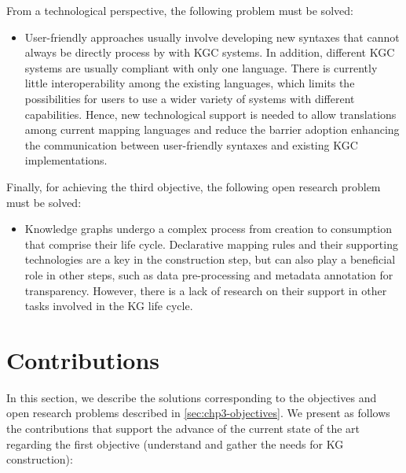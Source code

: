 From a technological perspective, the following problem must be solved:
\begin{itemize}

    \item User-friendly approaches usually involve developing new syntaxes that cannot always be directly process by with KGC systems. In addition, different KGC systems are usually compliant with only one language. There is currently little interoperability among the existing languages, which limits the possibilities for users to use a wider variety of systems with different capabilities. Hence, new technological support is needed to allow translations among current mapping languages and reduce the barrier adoption enhancing the communication between user-friendly syntaxes and existing KGC implementations.   

\end{itemize}

Finally, for achieving the third objective, the following open research problem must be solved:

\begin{itemize}
    \item Knowledge graphs undergo a complex process from creation to consumption that comprise their life cycle. Declarative mapping rules and their supporting technologies are a key in the construction step, but can also play a beneficial role in other steps, such as data pre-processing and metadata annotation for transparency. However, there is a lack of research on their support in other tasks involved in the KG life cycle.
\end{itemize}

\section{Contributions}
\label{sec:chp3-contributions}

In this section, we describe the solutions corresponding to the objectives and open research problems described in \cref{sec:chp3-objectives}. We present as follows the contributions that support the advance of the current state of the art regarding the first objective (understand and gather the needs for KG construction): 

